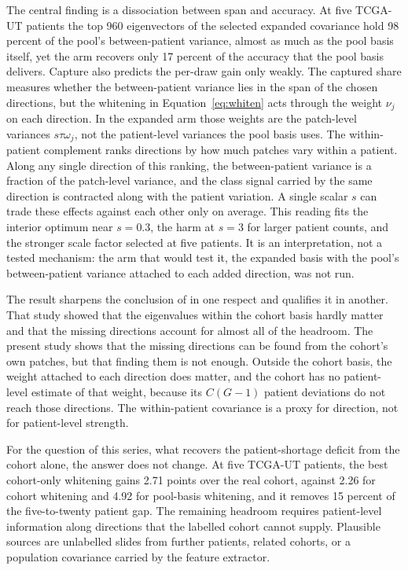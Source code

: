The central finding is a dissociation between span and accuracy. At five TCGA-UT patients the top 960 eigenvectors of the selected expanded covariance hold 98 percent of the pool's between-patient variance, almost as much as the pool basis itself, yet the arm recovers only 17 percent of the accuracy that the pool basis delivers. Capture also predicts the per-draw gain only weakly. The captured share measures whether the between-patient variance lies in the span of the chosen directions, but the whitening in Equation~\ref{eq:whiten} acts through the weight $\nu_j$ on each direction. In the expanded arm those weights are the patch-level variances $s\tau\omega_j$, not the patient-level variances the pool basis uses. The within-patient complement ranks directions by how much patches vary within a patient. Along any single direction of this ranking, the between-patient variance is a fraction of the patch-level variance, and the class signal carried by the same direction is contracted along with the patient variation. A single scalar $s$ can trade these effects against each other only on average. This reading fits the interior optimum near $s=0.3$, the harm at $s=3$ for larger patient counts, and the stronger scale factor selected at five patients. It is an interpretation, not a tested mechanism: the arm that would test it, the expanded basis with the pool's between-patient variance attached to each added direction, was not run.

The result sharpens the conclusion of \citet{queisler2026spectrumRegularization} in one respect and qualifies it in another. That study showed that the eigenvalues within the cohort basis hardly matter and that the missing directions account for almost all of the headroom. The present study shows that the missing directions can be found from the cohort's own patches, but that finding them is not enough. Outside the cohort basis, the weight attached to each direction does matter, and the cohort has no patient-level estimate of that weight, because its $C(G-1)$ patient deviations do not reach those directions. The within-patient covariance is a proxy for direction, not for patient-level strength.

For the question of this series, what recovers the patient-shortage deficit from the cohort alone, the answer does not change. At five TCGA-UT patients, the best cohort-only whitening gains 2.71 points over the real cohort, against 2.26 for cohort whitening and 4.92 for pool-basis whitening, and it removes 15 percent of the five-to-twenty patient gap. The remaining headroom requires patient-level information along directions that the labelled cohort cannot supply. Plausible sources are unlabelled slides from further patients, related cohorts, or a population covariance carried by the feature extractor.

